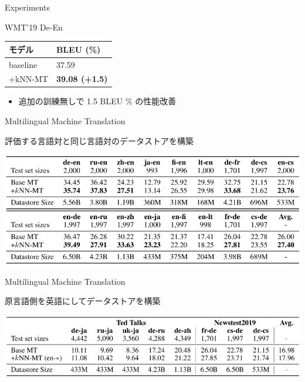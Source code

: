 \documentclass[unicode, 12pt, xdvipdfmx, aspectratio=43]{beamer}
\begin{document}
\begin{frame}[label={sec:orgc8277be}]{Experiments}
\begin{block}{WMT'19 De-En}
\begin{center}
\begin{tabular}{ll}
\toprule
モデル & BLEU (\%)\\
\midrule
baseline & 37.59\\
+kNN-MT & \textbf{39.08 (+1.5)}\\
\bottomrule
\end{tabular}
\end{center}

\begin{itemize}
\item 追加の訓練無しで 1.5 BLEU \% の性能改善
\end{itemize}
\end{block}
\end{frame}

\begin{frame}[label={sec:org2f786f8}]{Multilingual Machine Translation}
\begin{block}{評価する言語対と同じ言語対のデータストアを構築}
\begin{center}
\includegraphics[width=\linewidth]{./figure/Table1.pdf}
\end{center}
\end{block}
\end{frame}

\begin{frame}[label={sec:org4a553ea}]{Multilingual Machine Translation}
\begin{block}{原言語側を英語にしてデータストアを構築}
\begin{center}
\includegraphics[width=\linewidth]{./figure/Table2.pdf}
\end{center}
\end{block}
\end{frame}
\end{document}
